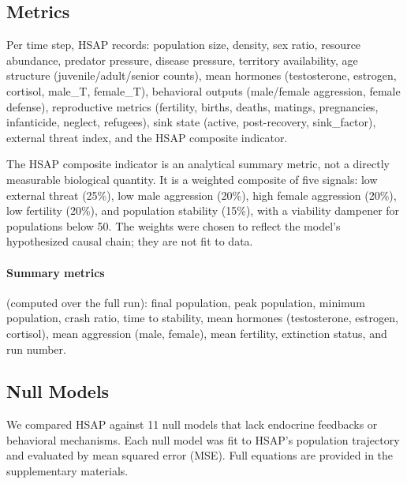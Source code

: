 \subsection{Metrics}
\label{sec:metrics}

Per time step, HSAP records: population size, density, sex ratio, resource abundance, predator pressure, disease pressure, territory availability, age structure (juvenile/adult/senior counts), mean hormones (testosterone, estrogen, cortisol, male\_T, female\_T), behavioral outputs (male/female aggression, female defense), reproductive metrics (fertility, births, deaths, matings, pregnancies, infanticide, neglect, refugees), sink state (active, post-recovery, sink\_factor), external threat index, and the HSAP composite indicator.

The HSAP composite indicator is an analytical summary metric, not a directly measurable biological quantity. It is a weighted composite of five signals: low external threat (25\%), low male aggression (20\%), high female aggression (20\%), low fertility (20\%), and population stability (15\%), with a viability dampener for populations below 50. The weights were chosen to reflect the model's hypothesized causal chain; they are not fit to data.

\paragraph{Summary metrics} (computed over the full run): final population, peak population, minimum population, crash ratio, time to stability, mean hormones (testosterone, estrogen, cortisol), mean aggression (male, female), mean fertility, extinction status, and run number.

\subsection{Null Models}
\label{sec:null_models}

We compared HSAP against 11 null models that lack endocrine feedbacks or behavioral mechanisms. Each null model was fit to HSAP's population trajectory and evaluated by mean squared error (MSE). Full equations are provided in the supplementary materials.

